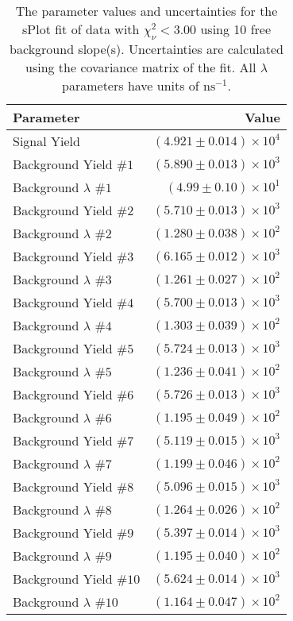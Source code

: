 
\begin{table}
    \begin{center}
        \begin{tabular}{lr}\toprule
            Parameter & Value \\\midrule
            Signal Yield & $(4.921 \pm 0.014) \times 10^{4}$ \\
            Background Yield $\#1$ & $(5.890 \pm 0.013) \times 10^{3}$ \\
            Background $\lambda$ $\#1$ & $(4.99 \pm 0.10) \times 10^{1}$ \\
            Background Yield $\#2$ & $(5.710 \pm 0.013) \times 10^{3}$ \\
            Background $\lambda$ $\#2$ & $(1.280 \pm 0.038) \times 10^{2}$ \\
            Background Yield $\#3$ & $(6.165 \pm 0.012) \times 10^{3}$ \\
            Background $\lambda$ $\#3$ & $(1.261 \pm 0.027) \times 10^{2}$ \\
            Background Yield $\#4$ & $(5.700 \pm 0.013) \times 10^{3}$ \\
            Background $\lambda$ $\#4$ & $(1.303 \pm 0.039) \times 10^{2}$ \\
            Background Yield $\#5$ & $(5.724 \pm 0.013) \times 10^{3}$ \\
            Background $\lambda$ $\#5$ & $(1.236 \pm 0.041) \times 10^{2}$ \\
            Background Yield $\#6$ & $(5.726 \pm 0.013) \times 10^{3}$ \\
            Background $\lambda$ $\#6$ & $(1.195 \pm 0.049) \times 10^{2}$ \\
            Background Yield $\#7$ & $(5.119 \pm 0.015) \times 10^{3}$ \\
            Background $\lambda$ $\#7$ & $(1.199 \pm 0.046) \times 10^{2}$ \\
            Background Yield $\#8$ & $(5.096 \pm 0.015) \times 10^{3}$ \\
            Background $\lambda$ $\#8$ & $(1.264 \pm 0.026) \times 10^{2}$ \\
            Background Yield $\#9$ & $(5.397 \pm 0.014) \times 10^{3}$ \\
            Background $\lambda$ $\#9$ & $(1.195 \pm 0.040) \times 10^{2}$ \\
            Background Yield $\#10$ & $(5.624 \pm 0.014) \times 10^{3}$ \\
            Background $\lambda$ $\#10$ & $(1.164 \pm 0.047) \times 10^{2}$ \\\bottomrule
        \end{tabular}
        \caption{The parameter values and uncertainties for the sPlot fit of data with $\chi^2_\nu < 3.00$ using 10 free background slope(s). Uncertainties are calculated using the covariance matrix of the fit. All $\lambda$ parameters have units of $\si{\nano\second}^{-1}$.}
    \end{center}
\end{table}
